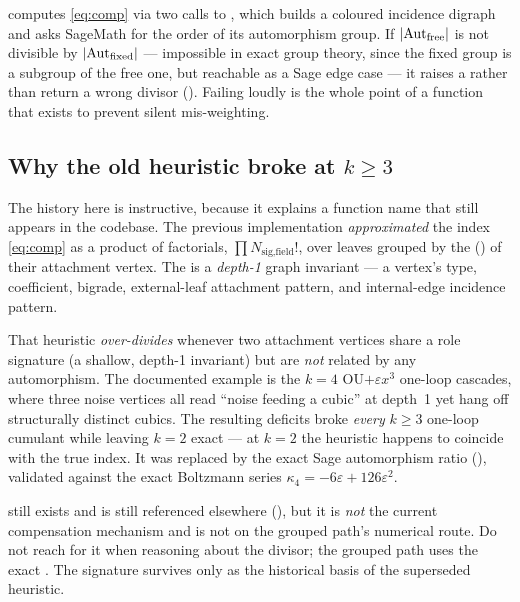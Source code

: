 \begin{note}
 computes \eqref{eq:comp} via two calls to
, which builds a coloured incidence digraph and asks
SageMath for the order of its automorphism group. If $|\mathrm{Aut}_{\text{free}}|$ is not
divisible by $|\mathrm{Aut}_{\text{fixed}}|$ --- impossible in exact group theory, since the
fixed group is a subgroup of the free one, but reachable as a Sage edge case --- it
raises a  rather than return a wrong divisor
(). Failing loudly is the whole point of a function
that exists to prevent silent mis-weighting.
\end{note}

\subsection{Why the old heuristic broke at \texorpdfstring{$k\ge 3$}{k>=3}}

The history here is instructive, because it explains a function name that still
appears in the codebase. The previous implementation \emph{approximated} the index
\eqref{eq:comp} as a product of factorials, $\prod N_{\text{sig,field}}!$, over
leaves grouped by the  () of
their attachment vertex. The  is a \emph{depth-1}
graph invariant --- a vertex's type, coefficient, bigrade, external-leaf attachment
pattern, and internal-edge incidence pattern.

That heuristic \emph{over-divides} whenever two attachment vertices share a role
signature (a shallow, depth-1 invariant) but are \emph{not} related by any
automorphism. The documented example is the $k=4$ OU$+\varepsilon x^3$ one-loop
cascades, where three noise vertices all read ``noise feeding a cubic'' at depth~1
yet hang off structurally distinct cubics. The resulting deficits broke
\emph{every} $k\ge 3$ one-loop cumulant while leaving $k=2$ exact --- at $k=2$ the
heuristic happens to coincide with the true index. It was replaced by the exact
Sage automorphism ratio (), validated against the exact
Boltzmann series $\kappa_4 = -6\varepsilon + 126\varepsilon^2$.

\begin{gotcha}
 still exists and is still referenced elsewhere
(), but it is \emph{not} the current compensation
mechanism and is not on the grouped path's numerical route. Do not reach for it
when reasoning about the divisor; the grouped path uses the exact
. The signature survives only as the historical
basis of the superseded heuristic.
\end{gotcha}

